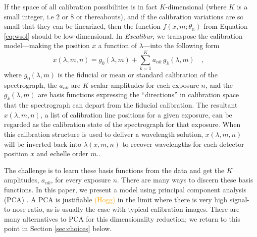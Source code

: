 \documentclass[modern]{aastex63}
\newcommand{\project}[1]{\textsl{#1}}
\newcommand{\name}{\project{Excalibur}}
\newcommand{\lz}[1]{\textcolor{orange}{#1}}
\begin{document}
If the space of all calibration possibilities is in fact $K$-dimensional (where $K$ is a small integer, i.e 2 or 8 or thereabouts), and if the calibration variations are so small that they can be linearized, then the function $f(x,m;\theta_{n})$ from Equation \ref{eq:wsol} should be low-dimensional.  In \name, we transpose the calibration model---making the position $x$ a function of $\lambda$---into the following form
\begin{equation}
x(\lambda,m,n) = g_0(\lambda,m) + \sum_{k=1}^K a_{nk}\,g_k(\lambda,m)
\quad ,
\label{eq:excl_wsol}
\end{equation}
where
$g_0(\lambda,m)$ is the fiducial or mean or standard calibration of the spectrograph,
the $a_{nk}$ are $K$ scalar amplitudes for each exposure $n$,
and the $g_k(\lambda,m)$ are basis functions expressing the ``directions'' in calibration space that the spectrograph can depart from the fiducial calibration.  The resultant $x(\lambda,m,n)$, a list of calibration line positions for a given exposure, can be regarded as the calibration state of the spectrograph for that exposure.  When this calibration structure is used to deliver a wavelength solution, $x(\lambda,m,n)$ will be inverted back into $\lambda(x,m,n)$ to recover wavelengths for each detector position $x$ and echelle order $m$..

The challenge is to learn these basis functions from the data and get the $K$ amplitudes, $a_{nk}$, for every exposure $n$.  There are many ways to discern these basis functions.  In this paper, we present a model using principal component analysis (PCA) \citep{wiki_pca}.  A PCA is justifiable \lz{(Hogg)} in the limit where there is very high signal-to-nose ratio, as is usually the case with typical calibration images.  There are many alternatives to PCA for this dimensionality reduction; we return to this point in Section \ref{sec:choices} below.
\end{document}
